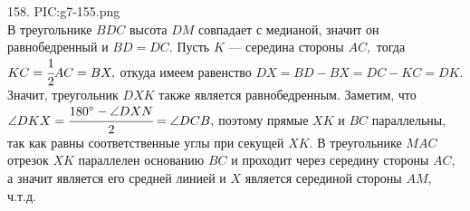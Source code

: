158. {{PIC:g7-155.png}}\\
В треугольнике $BDC$ высота $DM$ совпадает с медианой, значит он равнобедренный и $BD=DC.$ Пусть $K$ --- середина стороны $AC,$ тогда $KC=\cfrac{1}{2} AC=BX,$ откуда имеем равенство $DX=BD-BX=DC-KC=DK.$ Значит, треугольник $DXK$ также является равнобедренным. Заметим, что $\angle DKX=\cfrac{180^\circ-\angle DXN}{2}=\angle DCB,$ поэтому прямые $XK$ и $BC$ параллельны, так как равны соответственные углы при секущей $XK.$ В треугольнике $MAC$ отрезок $XK$ параллелен основанию $BC$ и проходит через середину стороны $AC,$ а значит является его средней линией и $X$ является серединой стороны $AM,$ ч.т.д.\\
